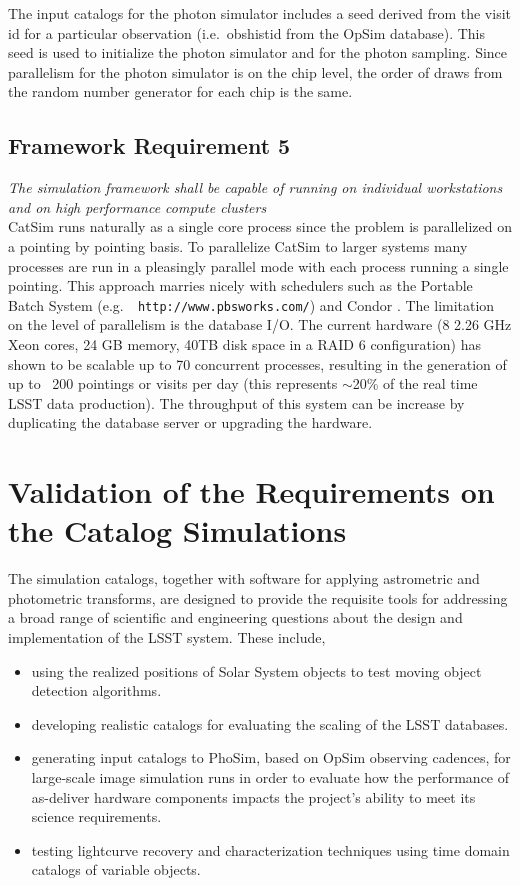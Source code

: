 \documentclass[11pt]{article}
\begin{document}
The input catalogs for the photon simulator includes a seed derived
from the visit id for a particular observation (i.e.\ obshistid from
the OpSim database). This seed is used to initialize the photon
simulator and for the photon sampling. Since parallelism for the
photon simulator is on the chip level, the order of draws from the
random number generator for each chip is the same.


\subsection{Framework Requirement 5}

{\it The simulation framework shall be capable of running on individual workstations 
and on high performance compute clusters}\\


CatSim runs naturally as a single core process since the problem is
parallelized on a pointing by pointing basis.  To parallelize CatSim
to larger systems many processes are run in a pleasingly parallel mode
with each process running a single pointing.  This approach marries
nicely with schedulers such as the Portable Batch System (e.g.\ {\tt
  http://www.pbsworks.com/}) and Condor \citep{condor}.  The
limitation on the level of parallelism is the database I/O.  The
current hardware (8 2.26 GHz Xeon cores, 24 GB memory, 40TB disk space
in a RAID 6 configuration) has shown to be scalable up to 70
concurrent processes, resulting in the generation of up to ~200
pointings or visits per day (this represents $\sim$20\% of the real
time LSST data production).  The throughput of this system can be
increase by duplicating the database server or upgrading the hardware.

\section{Validation of the Requirements on the Catalog Simulations}

The simulation catalogs, together with software for applying
astrometric and photometric transforms, are designed to provide the
requisite tools for addressing a broad range of scientific and
engineering questions about the design and implementation of the LSST
system. These include,
\begin{itemize}
\item using the realized positions of Solar System objects to
  test moving object detection algorithms.
\item developing realistic  catalogs for evaluating the scaling of the LSST databases.
\item generating input catalogs to PhoSim, based on OpSim observing
  cadences, for large-scale image simulation runs in order to evaluate
  how the performance of as-deliver hardware components impacts the
  project's ability to meet its science requirements.
\item testing lightcurve recovery and characterization techniques
  using time domain catalogs of variable objects.
\end{itemize}
\end{document}
